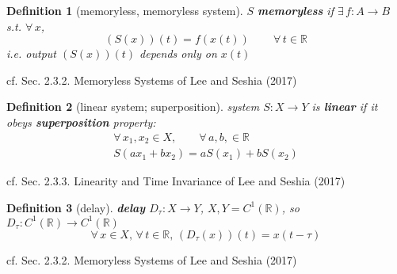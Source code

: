 \documentclass[10pt]{amsart}
\newtheorem{definition}{Definition}
\begin{document}
\begin{multicols*}{2}
\begin{definition}[memoryless, memoryless system]
$S$ \textbf{memoryless} if $\exists \, f :A\to B$ s.t. $\forall \, x$, 
\begin{equation}
(S(x))(t) = f(x(t)) \qquad \, \forall \, t \in \mathbb{R}
\end{equation}
i.e. output $(S(x))(t)$ depends \emph{only} on $x(t)$  
\end{definition}
cf. Sec. 2.3.2. Memoryless Systems of Lee and Seshia (2017) \cite{LeSe2017}

\begin{definition}[linear system; superposition]
system $S:X\to Y$ is \textbf{linear} if it obeys \textbf{superposition} property:
\begin{equation}
\begin{gathered}
	\forall \, x_1, x_2 \in X , \qquad \forall \, a,b, \in \mathbb{R} \\
S(ax_1 + bx_2) = aS(x_1) + bS(x_2)
\end{gathered}
\end{equation}
\end{definition}
cf. Sec. 2.3.3. Linearity and Time Invariance of Lee and Seshia (2017) \cite{LeSe2017}


\begin{definition}[delay]
\textbf{delay} $D_{\tau}:X\to Y$, $X,Y = C^1(\mathbb{R})$, so $D_{\tau}: C^1(\mathbb{R}) \to C^1(\mathbb{R})$  
\begin{equation}
	\forall \, x \in X, \, \forall \, t \in \mathbb{R}, \, (D_{\tau}(x))(t) = x(t-\tau)
\end{equation}
\end{definition}
cf. Sec. 2.3.2. Memoryless Systems of Lee and Seshia (2017) \cite{LeSe2017}


\end{multicols*}
\end{document}
